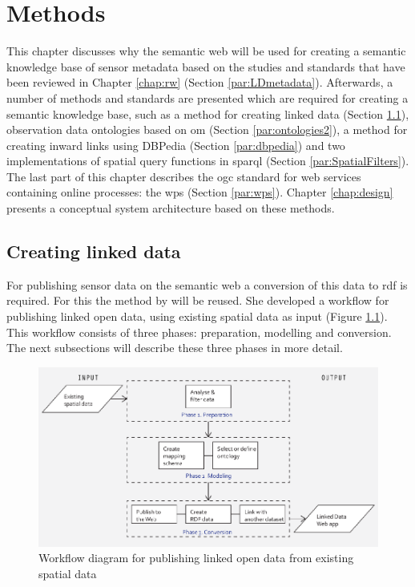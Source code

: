 


\chapter{Methods}
\label{chap:methods}

This chapter discusses why the semantic web will be used for creating a semantic knowledge base of sensor metadata based on the studies and standards that have been reviewed in Chapter \ref{chap:rw} (Section \ref{par:LDmetadata}). Afterwards, a number of methods and standards are presented which are required for creating a semantic knowledge base, such as a method for creating linked data (Section \ref{par:missier}), observation data ontologies based on \ac{om} (Section \ref{par:ontologies2}), a method for creating inward links using DBPedia (Section \ref{par:dbpedia}) and two implementations of spatial query functions in \ac{sparql} (Section \ref{par:SpatialFilters}). The last part of this chapter describes the \ac{ogc} standard for web services containing online processes: the \acf{wps} (Section \ref{par:wps}). Chapter \ref{chap:design} presents a conceptual system architecture based on these methods. 

\section{Creating linked data}
\label{par:missier}
For publishing sensor data on the semantic web a conversion of this data to \ac{rdf} is required. For this the method by \cite{LD:Missier} will be reused. She developed a workflow for publishing linked open data, using existing spatial data as input (Figure \ref{fig:missier}). This workflow consists of three phases: preparation, modelling and conversion. The next subsections will describe these three phases in more detail.

\begin{figure}
	\centering
	\includegraphics[width=1\linewidth]{UML/workflowMissier.png}
	\caption{Workflow diagram for publishing linked open data from existing spatial data \citep[p. 28]{LD:Missier}}
	\label{fig:missier}
\end{figure}

